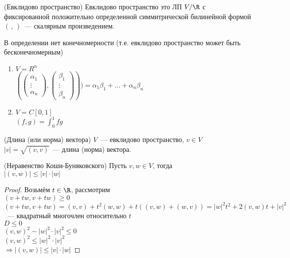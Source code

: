 \begin{conj}(Евклидово пространство)
    Евклидово пространство это ЛП $V / \R$ с фиксированной положительно определенной симмитрической билинейной формой $(\, , \,)$~--- скалярным произведением.
\end{conj}

\notice В определении нет конечномерности (т.е. евклидово пространство может быть бесконечномерным) \\
\begin{enumerate}
    \item $V = R^n$ \\
    $(\left(\begin{array}{c}
    \alpha_1 \\ 
    \vdots \\ 
    \alpha_n
    \end{array}\right)
    , \left(\begin{array}{c}
    \beta_1 \\ 
    \vdots \\ 
    \beta_n
    \end{array}\right)
    ) ) = \alpha_1 \beta_1 + \dots + \alpha_n \beta_n$
    \item $V = C[0, 1]$ \\
    $(f, g) = \int_{0}^{1} fg $
\end{enumerate}

\begin{conj}(Длина (или норма) вектора)
    $V$~--- евклидово пространство, $v \in V$ \\
    $|v| = \sqrt{(v, v)}$~--- длина (норма) вектора.
\end{conj}

\begin{theorem}(Неравенство Коши-Буняковского)
    Пусть $v, w \in V$, тогда \\
    $|(v, w)| \leqslant |v| \cdot |w|$ 
    \begin{proof}
    \emptyln
    Возьмём $t \in \R$, рассмотрим \\
    $(v + tw, v + tw) \geqslant 0$ \\
    $(v + tw, v + tw) = (v, v) + t^2 (w, w) + t((v,w) + (w, v)) = |w|^2t^2 + 2(v, w)t + |v|^2$ ~--- квадратный многочлен относительно $t$ \\
    $D \leqslant 0$ \\
    $(v, w)^2 - |w|^2 \cdot |v|^2 \leqslant 0$ \\
    $(v, w)^2 \leqslant |w|^2 \cdot |v|^2$ \\
    $\Longrightarrow |(v, w)| \leqslant |v| \cdot |w|$ 
    \end{proof}
\end{theorem}

